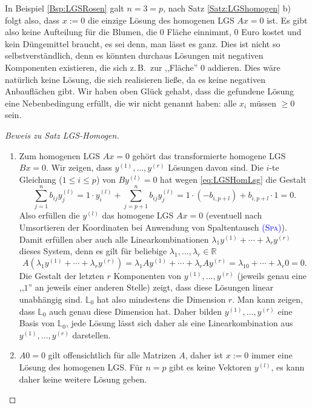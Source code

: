 \documentclass[a4paper,11pt,oneside]{article}
\theoremstyle{definition}
\def\OP#1{\textcolor{blue}{(\textnormal{\textrm{\textsc{#1}})}}}
\begin{document}
In Beispiel \ref{Bsp:LGSRosen} galt $n=3=p$, nach Satz \ref{Satz:LGShomogen} b) folgt also, dass $x:=0$ die einzige Lösung des homogenen LGS $Ax=0$ ist. Es gibt also keine Aufteilung für die Blumen, die $ 0$ Fläche einnimmt, $0$ Euro kostet und kein Düngemittel braucht, es sei denn, man lässt es ganz. Dies ist nicht so selbstverständlich, denn es könnten durchaus Lösungen mit negativen Komponenten existieren, die sich z.\,B.\ zur ,,Fläche'' $0$ addieren. Dies wäre natürlich keine Lösung, die sich realisieren ließe, da es keine negativen Anbauflächen gibt. Wir haben oben Glück gehabt, dass die gefundene Lösung eine Nebenbedingung erfüllt, die wir nicht genannt haben: alle $x_i$ müssen $\ge 0$ sein.

\begin{proof}[Beweis zu Satz LGS-Homogen]
\begin{enumerate}
\item
Zum homogenen LGS $Ax=0$ gehört das transformierte homogene LGS $Bx=0$. Wir zeigen, dass $y^{(1)},\ldots,y^{(r)}$ Lösungen davon sind. Die $i$-te Gleichung ($1\le i\le p$) von $By^{(l)}=0$ hat wegen \eqref{eq:LGSHomLsg} die Gestalt
\begin{equation}\label{eq:Hom1}
\sum_{j=1}^nb_{ij}y_j^{(l)}=1\cdot y_i^{(l)}+\sum_{j=p+1}^n b_{ij}y_j^{(l)}= 1\cdot( -b_{i,p+l})+ b_{i,p+l}\cdot 1 =0.
\end{equation}
Also erfüllen die $y^{(l)}$ das homogene LGS $ Ax=0$ (eventuell nach Umsortieren der Koordinaten bei Anwendung von Spaltentausch \OP{Spa}). Damit
erfüllen aber auch alle Linearkombinationen $\lambda_1 y^{(1)}+\cdots+\lambda_r y^{(r)}$ dieses System, denn es gilt für beliebige $\lambda_1,\ldots,\lambda_r \in\mathbb R$
\[
A(\lambda_1 y^{(1)}+\cdots+\lambda_r y^{(r)})= \lambda_1 Ay^{(1)}+\cdots+\lambda_rA y^{(r)}=\lambda_10 +\cdots+\lambda_r0=0.
\]
Die Gestalt der letzten $r$ Komponenten von $y^{(1)} ,\ldots,y^{(r)}$ (jeweils genau eine ,,$1$'' an jeweils einer anderen Stelle) zeigt, dass diese Lösungen linear unabhängig sind. ${\mathbb L}_0$ hat also mindestens die Dimension $r$. Man kann zeigen, dass ${\mathbb L}_0$  auch genau diese Dimension hat.  Daher bilden $y^{(1)},\ldots,y^{(r)}$ eine Basis von ${\mathbb L}_0$, jede Lösung lässt sich daher als eine Linearkombination aus $y^{(1)} ,\ldots,y^{(r)}$ darstellen.
\item
$A0=0$ gilt offensichtlich für alle Matrizen $A$, daher ist $x:=0$ immer eine Lösung des homogenen LGS. Für $n=p$ gibt es keine Vektoren $y^{(l)}$, es kann daher keine weitere Lösung geben.
\end{enumerate}
\end{proof}
\end{document}
